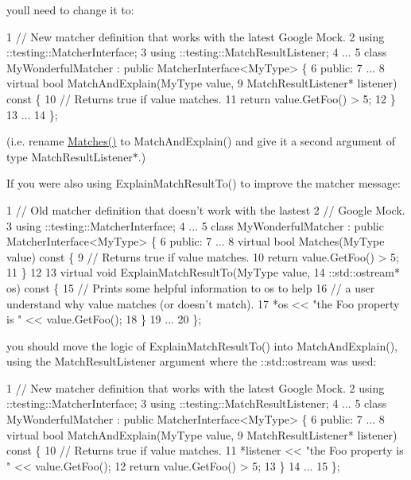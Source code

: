 you\textquotesingle{}ll need to change it to\+: 
\begin{DoxyCode}
1 // New matcher definition that works with the latest Google Mock.
2 using ::testing::MatcherInterface;
3 using ::testing::MatchResultListener;
4 ...
5 class MyWonderfulMatcher : public MatcherInterface<MyType> \{
6  public:
7   ...
8   virtual bool MatchAndExplain(MyType value,
9                                MatchResultListener* listener) const \{
10     // Returns true if value matches.
11     return value.GetFoo() > 5;
12   \}
13   ...
14 \};
\end{DoxyCode}
 (i.\+e. rename {\ttfamily \hyperlink{namespacetesting_ad53b509ae9cd51040d67f668f99702ae}{Matches()}} to {\ttfamily Match\+And\+Explain()} and give it a second argument of type {\ttfamily Match\+Result\+Listener$\ast$}.)

If you were also using {\ttfamily Explain\+Match\+Result\+To()} to improve the matcher message\+: 
\begin{DoxyCode}
1 // Old matcher definition that doesn't work with the lastest
2 // Google Mock.
3 using ::testing::MatcherInterface;
4 ...
5 class MyWonderfulMatcher : public MatcherInterface<MyType> \{
6  public:
7   ...
8   virtual bool Matches(MyType value) const \{
9     // Returns true if value matches.
10     return value.GetFoo() > 5;
11   \}
12 
13   virtual void ExplainMatchResultTo(MyType value,
14                                     ::std::ostream* os) const \{
15     // Prints some helpful information to os to help
16     // a user understand why value matches (or doesn't match).
17     *os << "the Foo property is " << value.GetFoo();
18   \}
19   ...
20 \};
\end{DoxyCode}


you should move the logic of {\ttfamily Explain\+Match\+Result\+To()} into {\ttfamily Match\+And\+Explain()}, using the {\ttfamily Match\+Result\+Listener} argument where the {\ttfamily \+::std\+::ostream} was used\+: 
\begin{DoxyCode}
1 // New matcher definition that works with the latest Google Mock.
2 using ::testing::MatcherInterface;
3 using ::testing::MatchResultListener;
4 ...
5 class MyWonderfulMatcher : public MatcherInterface<MyType> \{
6  public:
7   ...
8   virtual bool MatchAndExplain(MyType value,
9                                MatchResultListener* listener) const \{
10     // Returns true if value matches.
11     *listener << "the Foo property is " << value.GetFoo();
12     return value.GetFoo() > 5;
13   \}
14   ...
15 \};
\end{DoxyCode}


